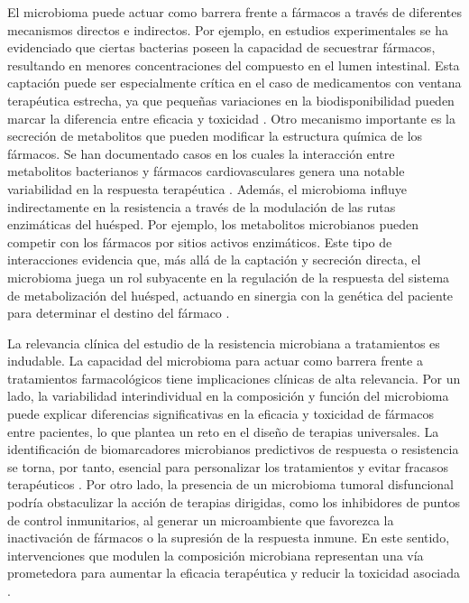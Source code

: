 El microbioma puede actuar como barrera frente a fármacos a través de diferentes mecanismos directos e indirectos. Por ejemplo, en estudios experimentales se ha evidenciado que ciertas bacterias poseen la capacidad de secuestrar fármacos, resultando en menores concentraciones del compuesto en el lumen intestinal. Esta captación puede ser especialmente crítica en el caso de medicamentos con ventana terapéutica estrecha, ya que pequeñas variaciones en la biodisponibilidad pueden marcar la diferencia entre eficacia y toxicidad \cite{scher2020pharmacomicrobiomics}. Otro mecanismo importante es la secreción de metabolitos que pueden modificar la estructura química de los fármacos. Se han documentado casos en los cuales la interacción entre metabolitos bacterianos y fármacos cardiovasculares genera una notable variabilidad en la respuesta terapéutica \cite{steiner2022role}. Además, el microbioma influye indirectamente en la resistencia a través de la modulación de las rutas enzimáticas del huésped. Por ejemplo, los metabolitos microbianos pueden competir con los fármacos por sitios activos enzimáticos. Este tipo de interacciones evidencia que, más allá de la captación y secreción directa, el microbioma juega un rol subyacente en la regulación de la respuesta del sistema de metabolización del huésped, actuando en sinergia con la genética del paciente para determinar el destino del fármaco \cite{verdegaal2024integrating}.

La relevancia clínica del estudio de la resistencia microbiana a tratamientos es indudable. La capacidad del microbioma para actuar como barrera frente a tratamientos farmacológicos tiene implicaciones clínicas de alta relevancia. Por un lado, la variabilidad interindividual en la composición y función del microbioma puede explicar diferencias significativas en la eficacia y toxicidad de fármacos entre pacientes, lo que plantea un reto en el diseño de terapias universales. La identificación de biomarcadores microbianos predictivos de respuesta o resistencia se torna, por tanto, esencial para personalizar los tratamientos y evitar fracasos terapéuticos \cite{dempsey2019microbiome}. Por otro lado, la presencia de un microbioma tumoral disfuncional podría obstaculizar la acción de terapias dirigidas, como los inhibidores de puntos de control inmunitarios, al generar un microambiente que favorezca la inactivación de fármacos o la supresión de la respuesta inmune. En este sentido, intervenciones que modulen la composición microbiana representan una vía prometedora para aumentar la eficacia terapéutica y reducir la toxicidad asociada \cite{garajova2021role}.

